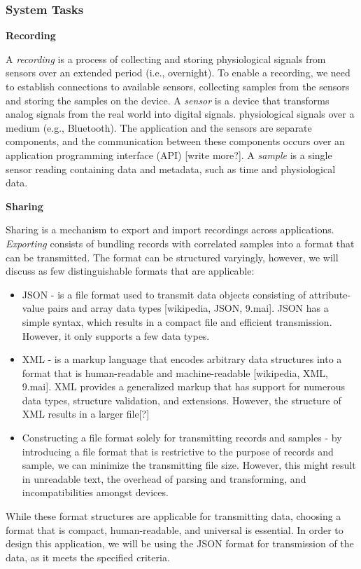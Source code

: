 \subsubsection{System Tasks}

\textbf{Recording}

\noindent A \textit{recording} is a process of collecting and storing physiological signals from sensors over an extended period (i.e., overnight). To enable a recording, we need to establish connections to available sensors, collecting samples from the sensors and storing the samples on the device. A \textit{sensor} is a device that transforms analog signals from the real world into digital signals.  physiological signals over a medium (e.g., Bluetooth). The application and the sensors are separate components, and the communication between these components occurs over an application programming interface (API) [write more?]. A \textit{sample} is a single sensor reading containing data and metadata, such as time and physiological data.  

\noindent \textbf{Sharing}

\noindent Sharing is a mechanism to export and import recordings across applications. \textit{Exporting} consists of bundling records with correlated samples into a format that can be transmitted. The format can be structured varyingly, however, we will discuss as few distinguishable formats that are applicable:

\begin{itemize}
    \item JSON - is a file format used to transmit data objects consisting of attribute-value pairs and array data types [wikipedia, JSON, 9.mai]. JSON has a simple syntax, which results in a compact file and efficient transmission. However, it only supports a few data types.
    \item XML - is a markup language that encodes arbitrary data structures into a format that is human-readable and machine-readable [wikipedia, XML, 9.mai]. XML provides a generalized markup that has support for numerous data types, structure validation, and extensions. However, the structure of XML results in a larger file[?]
    \item Constructing a file format solely for transmitting records and samples - by introducing a file format that is restrictive to the purpose of records and sample, we can minimize the transmitting file size. However, this might result in unreadable text, the overhead of parsing and transforming, and incompatibilities amongst devices. 
\end{itemize}
While these format structures are applicable for transmitting data, choosing a format that is compact, human-readable, and universal is essential. In order to design this application, we will be using the JSON format for transmission of the data, as it meets the specified criteria. 

